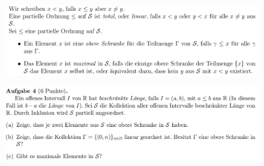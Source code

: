 \documentclass[a4paper]{scrartcl}
\begin{document}

\section*{}%
\label{sec:aufgabe_4}

    \begin{figure}[H]
        \centering
        \includegraphics[scale=0.3]{./total.png}
        \label{fig:./total}
    \end{figure}

    \begin{figure}[H]
        \centering
        \includegraphics[scale=0.3]{./A-4.png}
        \label{fig:}
    \end{figure}
\end{document}
